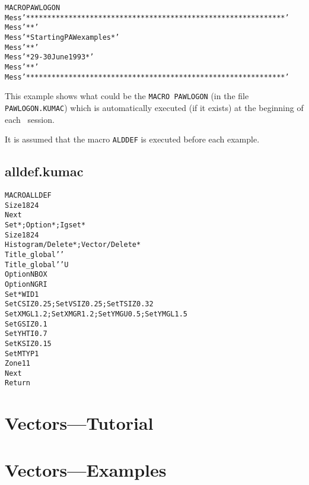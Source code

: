 \begin{alltt}
      MACRO PAWLOGON
      Mess '*************************************************************'
      Mess '*                                                           *'
      Mess '*                  Starting PAW examples                    *'
      Mess '*                                                           *'
      Mess '*                     29-30 June 1993                       *'
      Mess '*                                                           *'
      Mess '*************************************************************'
\end{alltt}

This example shows what could be the {\tt MACRO PAWLOGON} (in the file
{\tt PAWLOGON.KUMAC}) which is automatically executed (if it exists) at the
beginning of each \PAW\ session.

It is assumed that the macro {\tt ALDDEF} is executed before each example.

\subsection*{alldef.kumac}
\begin{alltt}
      MACRO ALLDEF
      Size 18 24
      Next
      Set * ; Option * ; Igset *
      Size 18 24
      Histogram/Delete * ; Vector/Delete *
      Title_global ' '
      Title_global ' ' U
      Option NBOX
      Option NGRI
      Set *WID 1
      Set CSIZ 0.25 ; Set VSIZ 0.25 ; Set TSIZ 0.32
      Set XMGL 1.2  ; Set XMGR 1.2  ; Set YMGU 0.5 ; Set YMGL 1.5
      Set GSIZ 0.1
      Set YHTI 0.7
      Set KSIZ 0.15
      Set MTYP 1
      Zone 1 1
      Next
      Return
\end{alltt} 

\clearpage
\section{Vectors---Tutorial}
\label{sec:tutvectors}
\clearpage
{}
\clearpage
{}
\clearpage
{}
\clearpage
\section{Vectors---Examples}
